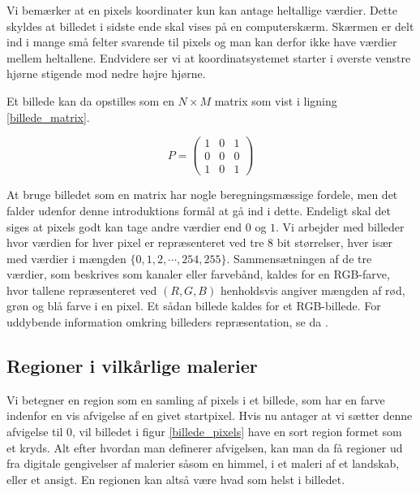 {Vi bemærker at en pixels koordinater kun kan antage heltallige værdier.
Dette skyldes at billedet i sidste ende skal vises på en computerskærm.
Skærmen er delt ind i mange små felter svarende til pixels og man kan
derfor ikke have værdier mellem heltallene.  Endvidere ser vi at
koordinatsystemet starter i øverste venstre hjørne stigende mod nedre
højre hjørne.

Et billede kan da opstilles som en $N \times M$ matrix som vist i
ligning \ref{billede_matrix}.

\begin{equation}
    P = \left ( \begin{array}{ccc}
        1 & 0 & 1 \\
        0 & 0 & 0 \\
        1 & 0 & 1
    \end{array} \right )
    \label{billede_matrix}
\end{equation}

At bruge billedet som en matrix har nogle beregningsmæssige fordele, men
det falder udenfor denne introduktions formål at gå ind i dette.
Endeligt skal det siges at pixels godt kan tage andre værdier end $0$ og
$1$. Vi arbejder med billeder hvor værdien for hver pixel er
repræsenteret ved tre 8 bit størrelser, hver især med værdier i mængden
$\{0, 1, 2, \cdots, 254, 255\}$. Sammensætningen af de tre værdier, som
beskrives som kanaler eller farvebånd, kaldes for en RGB-farve, hvor
tallene repræsenteret ved $(R,G,B)$ henholdsvis angiver mængden af rød,
grøn og blå farve i en pixel. Et sådan billede kaldes for et
RGB-billede. For uddybende information omkring billeders repræsentation,
se da \cite{SIOlsen}.

\subsection{Regioner i vilkårlige malerier}
Vi betegner en region som en samling af pixels i et billede, som har en
farve indenfor en vis afvigelse af en givet startpixel. Hvis nu antager
at vi sætter denne afvigelse til $0$, vil billedet i figur
\ref{billede_pixels} have en sort region formet som et kryds. Alt efter
hvordan man definerer afvigelsen, kan man da få regioner ud fra digitale
gengivelser af malerier såsom en himmel, i et maleri af et landskab,
eller et ansigt. En regionen kan altså være hvad som helst i billedet.

}
